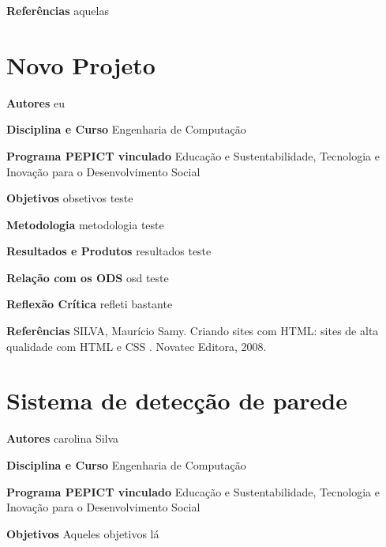 \documentclass[12pt,openright,oneside,a4paper]{report}
\begin{document}
\vspace{0.7cm}
\noindent
\textbf{Referências}
aquelas

\vspace{0.7cm}
\section{Novo Projeto}
\noindent
\textbf{Autores}
eu

\vspace{0.7cm}
\noindent
\textbf{Disciplina e Curso}
Engenharia de Computação

\vspace{0.7cm}
\noindent
\textbf{Programa PEPICT vinculado}
Educação e Sustentabilidade, Tecnologia e Inovação para o Desenvolvimento Social

\vspace{0.7cm}
\noindent
\textbf{Objetivos}
obsetivos teste

\vspace{0.7cm}
\noindent
\textbf{Metodologia}
metodologia teste

\vspace{0.7cm}
\noindent
\textbf{Resultados e Produtos}
resultados teste

\vspace{0.7cm}
\noindent
\textbf{Relação com os ODS}
osd teste

\vspace{0.7cm}
\noindent
\textbf{Reflexão Crítica}
refleti bastante

\vspace{0.7cm}
\noindent
\textbf{Referências}
SILVA, Maurício Samy. Criando sites com HTML: sites de alta qualidade com HTML e CSS . Novatec Editora, 2008.

\vspace{0.7cm}
\section{Sistema de detecção de parede}
\noindent
\textbf{Autores}
carolina Silva

\vspace{0.7cm}
\noindent
\textbf{Disciplina e Curso}
Engenharia de Computação

\vspace{0.7cm}
\noindent
\textbf{Programa PEPICT vinculado}
Educação e Sustentabilidade, Tecnologia e Inovação para o Desenvolvimento Social

\vspace{0.7cm}
\noindent
\textbf{Objetivos}
Aqueles objetivos lá
\end{document}
